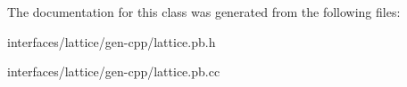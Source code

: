The documentation for this class was generated from the following files:\begin{DoxyCompactItemize}
\item 
interfaces/lattice/gen-\/cpp/lattice.pb.h\item 
interfaces/lattice/gen-\/cpp/lattice.pb.cc\end{DoxyCompactItemize}
